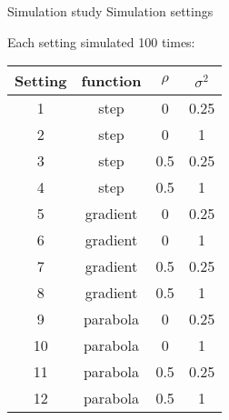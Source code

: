 \documentclass[12pt,t,handout]{beamer}
\newcommand{\subt}[1]{{\footnotesize \color{subtitle} {#1}}}
\begin{document}
\begin{frame}{Simulation study}
\subt{Simulation settings}

Each setting simulated 100 times:
    \begin{table}[h!]
        \begin{center}
        \begin{tabular}{cccc}
            \hline
            Setting & function & $\rho$ & $\sigma^2$ \\ 
            \hline
            1 & step & 0 & 0.25 \\ 
            2 & step & 0 & 1 \\ 
            3 & step & 0.5 & 0.25 \\ 
            4 & step & 0.5 & 1 \\ 
            \hline
            5 & gradient & 0 & 0.25 \\ 
            6 & gradient & 0 & 1 \\ 
            7 & gradient & 0.5 & 0.25 \\ 
            8 & gradient & 0.5 & 1 \\ 
            \hline
            9 & parabola & 0 & 0.25 \\ 
            10 & parabola & 0 & 1 \\ 
            11 & parabola & 0.5 & 0.25 \\ 
            12 & parabola & 0.5 & 1 
        \end{tabular}
        \end{center}
    \end{table}
\end{frame}
\end{document}
